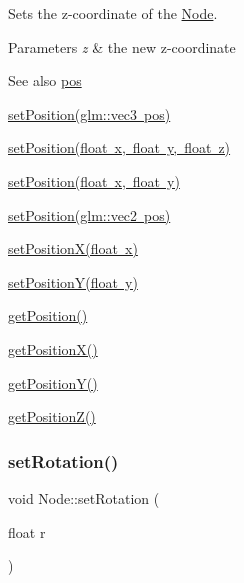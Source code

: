Sets the z-\/coordinate of the \mbox{\hyperlink{classsage_1_1Node}{Node}}. 


\begin{DoxyParams}{Parameters}
{\em z} & the new z-\/coordinate \\
\hline
\end{DoxyParams}
\begin{DoxySeeAlso}{See also}
\mbox{\hyperlink{classsage_1_1Node_a26c32e5ec11e0ed7f33053ecac6830d5}{pos}} 

\mbox{\hyperlink{classsage_1_1Node_a12f5d88d221aa5db70c2bd53f6dc049a}{set\+Position(glm\+::vec3 pos)}} 

\mbox{\hyperlink{classsage_1_1Node_ad9899110e543c6b16997512e47c142c9}{set\+Position(float x, float y, float z)}} 

\mbox{\hyperlink{classsage_1_1Node_aaa8545c103ef1b35e5076dbedab93af5}{set\+Position(float x, float y)}} 

\mbox{\hyperlink{classsage_1_1Node_ae2731cefe38e706c2bf21afae6da18b3}{set\+Position(glm\+::vec2 pos)}} 

\mbox{\hyperlink{classsage_1_1Node_ae1dfc73d6122a95778d5d9db3d1fd913}{set\+Position\+X(float x)}} 

\mbox{\hyperlink{classsage_1_1Node_a5c97d36655f0daa71a5f6c715d2b0470}{set\+Position\+Y(float y)}} 

\mbox{\hyperlink{classsage_1_1Node_a11fbdf2a2dcdf8bdc014df65f3003925}{get\+Position()}} 

\mbox{\hyperlink{classsage_1_1Node_a17e92da5beaeb4b299c4e93729a22b1a}{get\+Position\+X()}} 

\mbox{\hyperlink{classsage_1_1Node_a26337a40b7da400233451b71e85759cc}{get\+Position\+Y()}} 

\mbox{\hyperlink{classsage_1_1Node_a0c6023aabdeeff9cf981ad81e6aaed9c}{get\+Position\+Z()}} 
\end{DoxySeeAlso}
\mbox{\label{classsage_1_1Node_a422e877f5a830ad4d50b8e13250ee553}} 
\subsubsection{\texorpdfstring{setRotation()}{setRotation()}\hspace{0.1cm}{\footnotesize\ttfamily [1/2]}}
{\footnotesize\ttfamily void Node\+::set\+Rotation (\begin{DoxyParamCaption}\item[{float}]{r }\end{DoxyParamCaption})}



